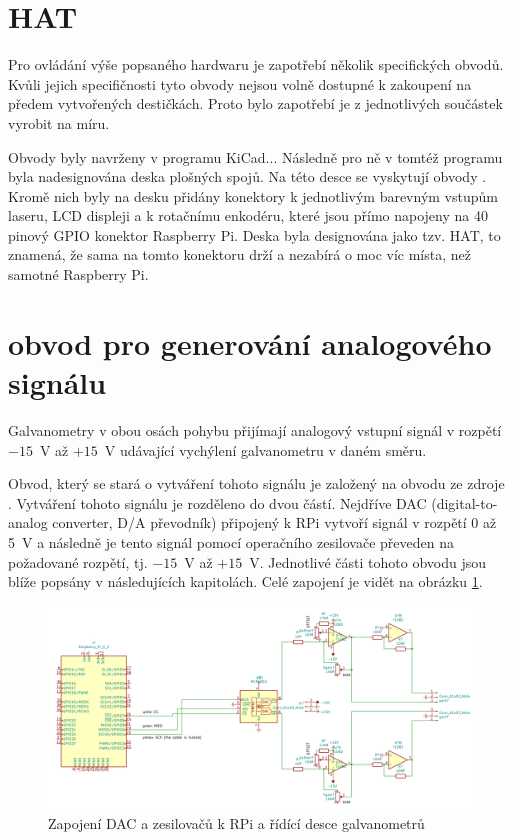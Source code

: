 \section{HAT}
Pro ovládání výše popsaného hardwaru je zapotřebí několik specifických obvodů.
Kvůli jejich specifičnosti tyto obvody nejsou volně dostupné k zakoupení na předem vytvořených destičkách. Proto bylo zapotřebí je z jednotlivých součástek vyrobit na míru.

Obvody byly navrženy v programu KiCad...
Následně pro ně v tomtéž programu byla nadesignována deska plošných spojů. Na této desce se vyskytují obvody .
Kromě nich byly na desku přidány konektory k jednotlivým barevným vstupům laseru, LCD displeji a k rotačnímu enkodéru, které jsou přímo napojeny na 40 pinový GPIO konektor Raspberry Pi.
Deska byla designována jako tzv. HAT, to znamená, že sama na tomto konektoru drží a nezabírá o moc víc místa, než samotné Raspberry Pi.


\section{obvod pro generování analogového signálu}
Galvanometry v obou osách pohybu přijímají analogový vstupní signál v rozpětí $-15$~V až $+15$~V udávající vychýlení galvanometru v daném směru.

Obvod, který se stará o vytváření tohoto signálu je založený na obvodu ze zdroje \cite{lasershow-with-real-galvos}.
Vytváření tohoto signálu je rozděleno do dvou částí. Nejdříve DAC (digital-to-analog converter, D/A převodník) připojený k RPi vytvoří signál v rozpětí 0 až 5~V a následně je tento signál pomocí operačního zesilovače převeden na požadované rozpětí, tj. $-15$~V až $+15$~V.
Jednotlivé části tohoto obvodu jsou blíže popsány v následujících kapitolách. Celé zapojení je vidět na obrázku \ref{fig:dac_board}.
\begin{figure}[!htb]
  \centering
  \includegraphics[width=1\textwidth]{img/dac_board.png} 
  \caption{\label{fig:dac_board}Zapojení DAC a zesilovačů k RPi a řídící desce galvanometrů}
\end{figure}

